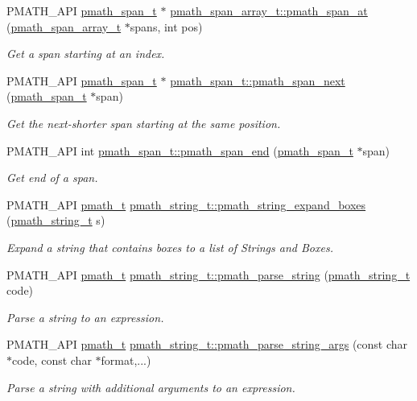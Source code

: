 \begin{CompactItemize}
PMATH\_\-API \hyperlink{classpmath__span__t}{pmath\_\-span\_\-t} $\ast$ \hyperlink{group__parser_g8f106cc9c1ae23635bbd759072505c27}{pmath\_\-span\_\-array\_\-t::pmath\_\-span\_\-at} (\hyperlink{classpmath__span__array__t}{pmath\_\-span\_\-array\_\-t} $\ast$spans, int pos)
\begin{CompactList}\small\item\em Get a span starting at an index. \item\end{CompactList}\item 
PMATH\_\-API \hyperlink{classpmath__span__t}{pmath\_\-span\_\-t} $\ast$ \hyperlink{group__parser_g851892aa27e31d261213853112567202}{pmath\_\-span\_\-t::pmath\_\-span\_\-next} (\hyperlink{classpmath__span__t}{pmath\_\-span\_\-t} $\ast$span)
\begin{CompactList}\small\item\em Get the next-shorter span starting at the same position. \item\end{CompactList}\item 
PMATH\_\-API int \hyperlink{group__parser_g67b9dc2f6484ebbe48481b2b87d76b33}{pmath\_\-span\_\-t::pmath\_\-span\_\-end} (\hyperlink{classpmath__span__t}{pmath\_\-span\_\-t} $\ast$span)
\begin{CompactList}\small\item\em Get end of a span. \item\end{CompactList}\item 
PMATH\_\-API \hyperlink{classpmath__t}{pmath\_\-t} \hyperlink{group__parser_g78a874e9d0b6aca112bad336d319a1c1}{pmath\_\-string\_\-t::pmath\_\-string\_\-expand\_\-boxes} (\hyperlink{classpmath__string__t}{pmath\_\-string\_\-t} s)
\begin{CompactList}\small\item\em Expand a string that contains boxes to a list of Strings and Boxes. \item\end{CompactList}\item 
PMATH\_\-API \hyperlink{classpmath__t}{pmath\_\-t} \hyperlink{group__parser_g30c73f2fbcd116125cb5befd26b35ec4}{pmath\_\-string\_\-t::pmath\_\-parse\_\-string} (\hyperlink{classpmath__string__t}{pmath\_\-string\_\-t} code)
\begin{CompactList}\small\item\em Parse a string to an expression. \item\end{CompactList}\item 
PMATH\_\-API \hyperlink{classpmath__t}{pmath\_\-t} \hyperlink{group__parser_gac02e250fcd91e4fc03f0f7e8a6dd571}{pmath\_\-string\_\-t::pmath\_\-parse\_\-string\_\-args} (const char $\ast$code, const char $\ast$format,...)
\begin{CompactList}\small\item\em Parse a string with additional arguments to an expression. \item\end{CompactList}\end{CompactItemize}


